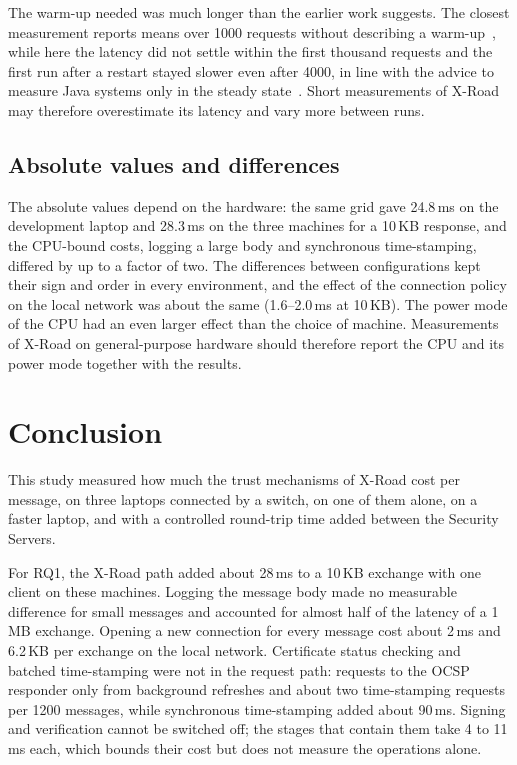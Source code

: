 \documentclass[conference,a4paper]{IEEEtran}
\begin{document}
The warm-up needed was much longer than the earlier work suggests. The closest measurement reports
means over 1000 requests without describing a warm-up~\cite{bakhtina2026ijis}, while here the latency did not settle
within the first thousand requests and the first run after a restart stayed slower even after 4000, in line with
the advice to measure Java systems only in the steady state~\cite{georges2007}. Short measurements of
X-Road may therefore overestimate its latency and vary more between runs.

\subsection{Absolute values and differences}

The absolute values depend on the hardware: the same grid gave 24.8\,ms on the development laptop and
28.3\,ms on the three machines for a 10\,KB response, and the CPU-bound costs, logging a large body
and synchronous time-stamping, differed by up to a factor of two. The differences between
configurations kept their sign and order in every environment, and the effect of the connection
policy on the local network was about the same (1.6--2.0\,ms at 10\,KB). The power mode of the CPU had an
even larger effect than the choice of machine. Measurements of X-Road on general-purpose hardware
should therefore report the CPU and its power mode together with the results.

\section{Conclusion}

This study measured how much the trust mechanisms of X-Road cost per message, on three laptops
connected by a switch, on one of them alone, on a faster laptop, and with a controlled round-trip time
added between the Security Servers.

For RQ1, the X-Road path added about 28\,ms to a 10\,KB exchange with one client on these machines.
Logging the message body made no measurable difference for small messages and accounted for almost
half of the latency of a 1\,MB exchange. Opening a new connection for every message cost about 2\,ms
and 6.2\,KB per exchange on the local network. Certificate status checking and batched time-stamping
were not in the request path: requests to the OCSP responder only from background refreshes and about two time-stamping
requests per 1200 messages,
while synchronous time-stamping added about 90\,ms. Signing and verification cannot be switched off;
the stages that contain them take 4 to 11\,ms each, which bounds their cost but does not measure the
operations alone.
\end{document}
